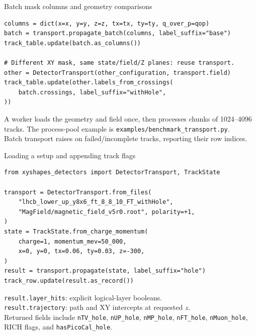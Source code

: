\documentclass[aspectratio=169,10pt]{beamer}
\begin{document}
\begin{frame}[fragile]{Batch mask columns and geometry comparisons}
\small
\begin{verbatim}
columns = dict(x=x, y=y, z=z, tx=tx, ty=ty, q_over_p=qop)
batch = transport.propagate_batch(columns, label_suffix="base")
track_table.update(batch.as_columns())

# Different XY mask, same state/field/Z planes: reuse transport.
other = DetectorTransport(other_configuration, transport.field)
track_table.update(other.labels_from_crossings(
    batch.crossings, label_suffix="withHole",
))
\end{verbatim}
\vspace{3mm}
\small A worker loads the geometry and field once, then processes chunks of
1024--4096 tracks. The process-pool example is
\texttt{examples/benchmark\_transport.py}.\\[2mm]
Batch transport raises on failed/incomplete tracks, reporting their row indices.
\end{frame}

\begin{frame}[fragile]{Loading a setup and appending track flags}
\small
\begin{verbatim}
from xyshapes_detectors import DetectorTransport, TrackState

transport = DetectorTransport.from_files(
    "lhcb_lower_up_y8x6_ft_8_8_10_FT_withHole",
    "MagField/magnetic_field_v5r0.root", polarity=+1,
)
state = TrackState.from_charge_momentum(
    charge=1, momentum_mev=50_000,
    x=0, y=0, tx=0.06, ty=0.03, z=-300,
)
result = transport.propagate(state, label_suffix="hole")
track_row.update(result.as_record())
\end{verbatim}
\small
\texttt{result.layer\_hits}: explicit logical-layer booleans.\\
\texttt{result.trajectory}: path and XY intercepts at requested $z$.\\
Returned fields include \texttt{nTV\_hole}, \texttt{nUP\_hole}, \texttt{nMP\_hole},
\texttt{nFT\_hole}, \texttt{nMuon\_hole}, RICH flags, and \texttt{hasPicoCal\_hole}.
\end{frame}
\end{document}
